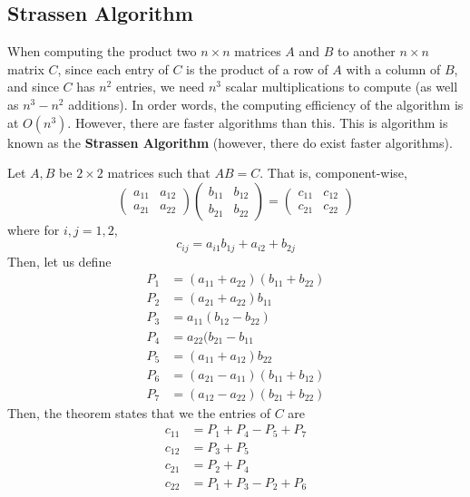 \subsection{Strassen Algorithm}

  When computing the product two $n \times n$ matrices $A$ and $B$ to another $n \times n$ matrix $C$, since each entry of $C$ is the product of a row of $A$ with a column of $B$, and since $C$ has $n^2$ entries, we need $n^3$ scalar multiplications to compute (as well as $n^3 - n^2$ additions). In order words, the computing efficiency of the algorithm is at $O(n^3)$. However, there are faster algorithms than this. This is algorithm is known as the \textbf{Strassen Algorithm} (however, there do exist faster algorithms). 

  \begin{theorem}
    Let $A, B$ be $2 \times 2$ matrices such that $AB = C$. That is, component-wise,
    \begin{equation}
      \begin{pmatrix}
      a_{11} & a_{12} \\ a_{21} & a_{22}
      \end{pmatrix} \begin{pmatrix}
      b_{11} & b_{12} \\ b_{21} & b_{22}
      \end{pmatrix}
       = \begin{pmatrix}
        c_{11} & c_{12} \\ c_{21} & c_{22}
       \end{pmatrix}
    \end{equation}
    where for $i, j = 1, 2$, 
    \begin{equation}
      c_{ij} = a_{i1} b_{1j} + a_{i2} + b_{2j}
    \end{equation}
    Then, let us define 
    \begin{align*}
      P_1 &= (a_{11} + a_{22}) (b_{11} + b_{22}) \\
      P_2 &= (a_{21} + a_{22}) b_{11} \\
      P_3 &= a_{11} (b_{12} - b_{22}) \\
      P_4 &= a_{22} (b_{21} - b_{11} \\
      P_5 &= (a_{11} + a_{12}) b_{22} \\
      P_6 &= (a_{21} - a_{11}) (b_{11} + b_{12}) \\
      P_7 &= (a_{12} - a_{22}) (b_{21} + b_{22}) 
    \end{align*}
    Then, the theorem states that we the entries of $C$ are 
    \begin{align*}
      c_{11} &= P_1 + P_4 - P_5 + P_7 \\
      c_{12} &= P_3 + P_5 \\
      c_{21} &= P_2 + P_4 \\
      c_{22} &= P_1 + P_3 - P_2 + P_6
    \end{align*}
  \end{theorem}

